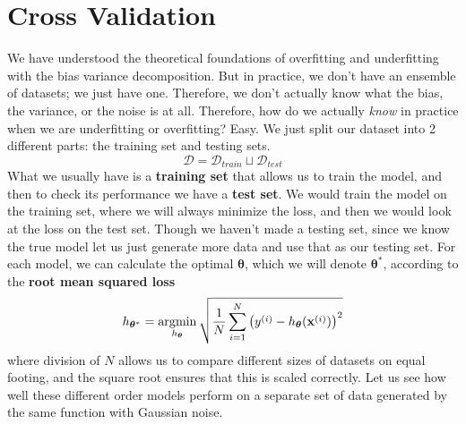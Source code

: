 \section{Cross Validation} 

  We have understood the theoretical foundations of overfitting and underfitting with the bias variance decomposition. But in practice, we don't have an ensemble of datasets; we just have one. Therefore, we don't actually know what the bias, the variance, or the noise is at all. Therefore, how do we actually \textit{know} in practice when we are underfitting or overfitting? Easy. We just split our dataset into 2 different parts: the training set and testing sets. 
  \begin{equation}
    \mathcal{D} = \mathcal{D}_{train} \sqcup \mathcal{D}_{test}
  \end{equation}
  What we usually have is a \textbf{training set} that allows us to train the model, and then to check its performance we have a \textbf{test set}. We would train the model on the training set, where we will always minimize the loss, and then we would look at the loss on the test set. Though we haven't made a testing set, since we know the true model let us just generate more data and use that as our testing set. For each model, we can calculate the optimal $\boldsymbol{\theta}$, which we will denote $\boldsymbol{\theta}^\ast$, according to the \textbf{root mean squared loss}
  \begin{equation}
    h_{\boldsymbol{\theta}^\ast} = \argmin_{h_{\boldsymbol{\theta}}} \sqrt{ \frac{1}{N} \sum_{i=1}^N \big( y^{(i)} - h_{\boldsymbol{\theta}} (\mathbf{x}^{(i)}) \big)^2 }
  \end{equation}
  where division of $N$ allows us to compare different sizes of datasets on equal footing, and the square root ensures that this is scaled correctly. Let us see how well these different order models perform on a separate set of data generated by the same function with Gaussian noise. 

